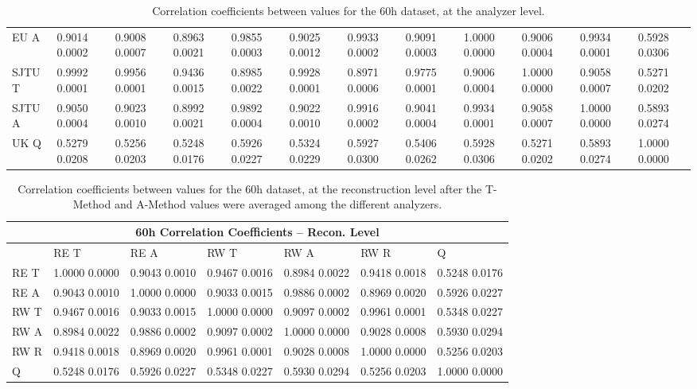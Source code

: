 \begin{landscape}
\begin{table}
\begin{tabularx}{1\linewidth}{@{\extracolsep{\fill}}lXXXXXXXXXXX}
	EU A   & 0.9014 0.0002 & 0.9008 0.0007 & 0.8963 0.0021 & 0.9855 0.0003 & 0.9025 0.0012 & 0.9933 0.0002 & 0.9091 0.0003 & 1.0000 0.0000 & 0.9006 0.0004 & 0.9934 0.0001 & 0.5928 0.0306  \\
	SJTU T & 0.9992 0.0001 & 0.9956 0.0001 & 0.9436 0.0015 & 0.8985 0.0022 & 0.9928 0.0001 & 0.8971 0.0006 & 0.9775 0.0001 & 0.9006 0.0004 & 1.0000 0.0000 & 0.9058 0.0007 & 0.5271 0.0202  \\
	SJTU A & 0.9050 0.0004 & 0.9023 0.0010 & 0.8992 0.0021 & 0.9892 0.0004 & 0.9022 0.0010 & 0.9916 0.0002 & 0.9041 0.0004 & 0.9934 0.0001 & 0.9058 0.0007 & 1.0000 0.0000 & 0.5893 0.0274  \\
	UK Q   & 0.5279 0.0208 & 0.5256 0.0203 & 0.5248 0.0176 & 0.5926 0.0227 & 0.5324 0.0229 & 0.5927 0.0300 & 0.5406 0.0262 & 0.5928 0.0306 & 0.5271 0.0202 & 0.5893 0.0274 & 1.0000 0.0000  \\
  \bottomrule
\end{tabularx}
\caption[]{Correlation coefficients between \R values for the 60h dataset, at the analyzer level.}
\label{tab:Corrs_60h_analyzer}
\end{table}
\end{landscape}


\begin{table}
\setlength\tabcolsep{15pt}
\small
\centering
\renewcommand{\arraystretch}{1.4}
\begin{tabularx}{0.8\linewidth}{@{\extracolsep{\fill}}lXXXXXX}
  \toprule
  	\multicolumn{7}{c}{{\normalsize 60h Correlation Coefficients -- Recon. Level}} \\
  \midrule
  	       & RE T & RE A & RW T & RW A & RW R & \quad Q \\
  \midrule
	RE T   & 1.0000 0.0000 & 0.9043 0.0010 & 0.9467 0.0016 & 0.8984 0.0022 & 0.9418 0.0018 & 0.5248 0.0176  \\
	RE A   & 0.9043 0.0010 & 1.0000 0.0000 & 0.9033 0.0015 & 0.9886 0.0002 & 0.8969 0.0020 & 0.5926 0.0227  \\
	RW T   & 0.9467 0.0016 & 0.9033 0.0015 & 1.0000 0.0000 & 0.9097 0.0002 & 0.9961 0.0001 & 0.5348 0.0227  \\
	RW A   & 0.8984 0.0022 & 0.9886 0.0002 & 0.9097 0.0002 & 1.0000 0.0000 & 0.9028 0.0008 & 0.5930 0.0294  \\
	RW R   & 0.9418 0.0018 & 0.8969 0.0020 & 0.9961 0.0001 & 0.9028 0.0008 & 1.0000 0.0000 & 0.5256 0.0203  \\
	Q      & 0.5248 0.0176 & 0.5926 0.0227 & 0.5348 0.0227 & 0.5930 0.0294 & 0.5256 0.0203 & 1.0000 0.0000  \\
  \bottomrule
\end{tabularx}
\caption[]{Correlation coefficients between \R values for the 60h dataset, at the reconstruction level after the \RW T-Method and A-Method \R values were averaged among the different analyzers.}
\label{tab:Corrs_60h_recon}
\end{table}


